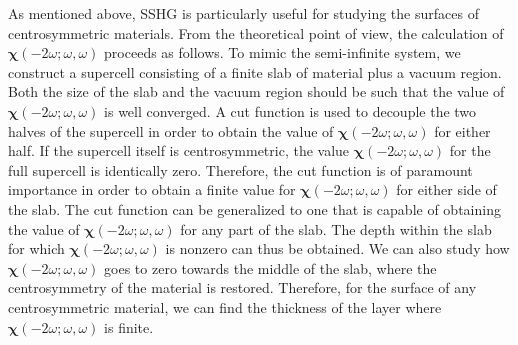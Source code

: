 \documentclass[aps,prb,10pt,showpacs,letterpaper,twocolumn]{revtex4-1}
\begin{document}
As mentioned above, SSHG is particularly useful for studying the surfaces of
centrosymmetric materials. From the theoretical point of view, the calculation
of $\boldsymbol{\chi}(-2\omega;\omega,\omega)$ proceeds as follows. To mimic the
semi-infinite system, we construct a supercell consisting of a finite slab of
material plus a vacuum region. Both the size of the slab and the vacuum region
should be such that the value of $\boldsymbol{\chi}(-2\omega;\omega,\omega)$ is
well converged.  A cut function is used to decouple the two halves of the
supercell in order to obtain the value of
$\boldsymbol{\chi}(-2\omega;\omega,\omega)$ for either half. If the supercell
itself is centrosymmetric, the value $\boldsymbol{\chi}(-2\omega;\omega,\omega)$
for the full supercell is identically zero. Therefore, the cut function is of
paramount importance in order to obtain a finite value for
$\boldsymbol{\chi}(-2\omega;\omega,\omega)$ for either side of the
slab.\cite{reiningPRB94,andersonPRB15,andersonPRB16} The cut function can be
generalized to one that is capable of obtaining the value of
$\boldsymbol{\chi}(-2\omega;\omega,\omega)$ for any part of the slab. The depth
within the slab for which $\boldsymbol{\chi}(-2\omega;\omega,\omega)$ is nonzero
can thus be obtained. We can also study how
$\boldsymbol{\chi}(-2\omega;\omega,\omega)$ goes to zero towards the middle of
the slab, where the centrosymmetry of the material is restored.\cite{mejiaRMF04}
Therefore, for the surface of any centrosymmetric material, we can find the
thickness of the layer where $\boldsymbol{\chi}(-2\omega;\omega,\omega)$ is
finite.
\end{document}
